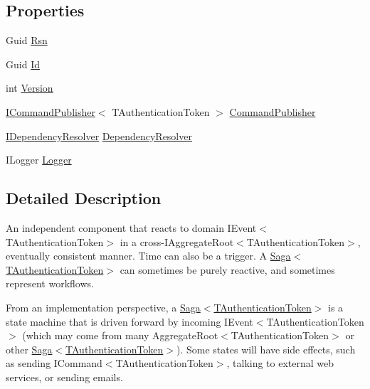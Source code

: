 \subsection*{Properties}
\begin{DoxyCompactItemize}
\item 
Guid \hyperlink{classCqrs_1_1Domain_1_1Saga_a2a7053e3d31629aa8a25cb38a238aca5}{Rsn}
\item 
Guid \hyperlink{classCqrs_1_1Domain_1_1Saga_af6b9552a90fcbe5c101c413126256565}{Id}
\item 
int \hyperlink{classCqrs_1_1Domain_1_1Saga_a581e88da4e3e76d3704586f97866a7a6}{Version}
\item 
\hyperlink{interfaceCqrs_1_1Commands_1_1ICommandPublisher}{I\+Command\+Publisher}$<$ T\+Authentication\+Token $>$ \hyperlink{classCqrs_1_1Domain_1_1Saga_a944fc264b716dcd60a2e51c9897766fa}{Command\+Publisher}
\item 
\hyperlink{interfaceCqrs_1_1Configuration_1_1IDependencyResolver}{I\+Dependency\+Resolver} \hyperlink{classCqrs_1_1Domain_1_1Saga_afd8b9bae392272e1651f2ea53c65db12}{Dependency\+Resolver}
\item 
I\+Logger \hyperlink{classCqrs_1_1Domain_1_1Saga_aafb1c7c3c83211709322470a8fd150b5}{Logger}
\end{DoxyCompactItemize}


\subsection{Detailed Description}
An independent component that reacts to domain I\+Event$<$\+T\+Authentication\+Token$>$ in a cross-\/I\+Aggregate\+Root$<$\+T\+Authentication\+Token$>$, eventually consistent manner. Time can also be a trigger. A \hyperlink{classCqrs_1_1Domain_1_1Saga_a1b6019cecbbf2572b64dd456cb5d91a2}{Saga$<$\+T\+Authentication\+Token$>$} can sometimes be purely reactive, and sometimes represent workflows. 

From an implementation perspective, a \hyperlink{classCqrs_1_1Domain_1_1Saga_a1b6019cecbbf2572b64dd456cb5d91a2}{Saga$<$\+T\+Authentication\+Token$>$} is a state machine that is driven forward by incoming I\+Event$<$\+T\+Authentication\+Token$>$ (which may come from many Aggregate\+Root$<$\+T\+Authentication\+Token$>$ or other \hyperlink{classCqrs_1_1Domain_1_1Saga_a1b6019cecbbf2572b64dd456cb5d91a2}{Saga$<$\+T\+Authentication\+Token$>$}). Some states will have side effects, such as sending I\+Command$<$\+T\+Authentication\+Token$>$, talking to external web services, or sending emails. 

